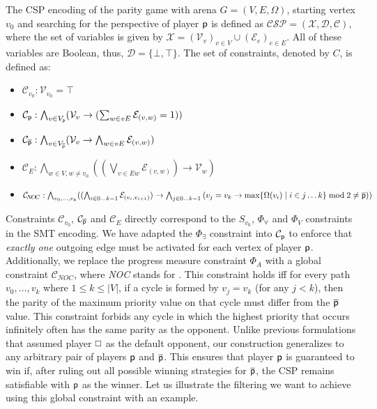 \documentclass[runningheads]{llncs}
\begin{document}
\begin{definition}\label{def:csp}
    The CSP encoding of the parity game with arena $G=(V,E,\Omega)$, starting vertex $v_0$ and searching for the perspective of player $\mathsf{p}$ is defined as $\mathcal{CSP = (X, D, C)}$, where the set of variables is given by $\mathcal{X} = (\mathcal{V}_v)_{v \in V} \cup (\mathcal{E}_e)_{e \in E}$. All of these variables are Boolean, thus, $\mathcal{D} = \{\bot,\top\}$. The set of constraints, denoted by $C$, is defined as:
    \begin{itemize}
        \item $\mathcal{C}_{v_0} : \mathcal{V}_{v_0} = \top$
        \item $\mathcal{C}_{\mathsf{p}} : \bigwedge_{v \in V_{\mathsf{p}}} (\mathcal{V}_v \rightarrow (\sum_{w \in vE} \mathcal{E}_{(v,w)}= 1))$
        \item $\mathcal{C}_{\overline{\mathsf{p}}} : \bigwedge_{v \in V_{\overline{\mathsf{p}}}} (\mathcal{V}_v \rightarrow \bigwedge_{w \in vE} \mathcal{E}_{(v,w)})$
        \item $\mathcal{C}_{\!E} : \bigwedge_{w \in V, w \neq v_0} ((\bigvee_{v \in Ew} \mathcal{E}_{(v,w)}) \rightarrow \mathcal{V}_w)$
        \item $\mathcal{C}_{\!N\!O\!C} : \bigwedge_{v_0, \dots, v_k} ((\bigwedge_{i\in 0\dots k-1} \mathcal{E}_{(v_i,v_{i+1})}) \rightarrow \bigwedge_{j\in 0\dots k-1}\\ (v_j=v_k \rightarrow \max\{\Omega(v_i) \mid i\in j\dots k\} \bmod 2 \ne \overline{\mathsf{p}}))$
    \end{itemize}
\end{definition}

Constraints $\mathcal{C}_{v_0}$, $\mathcal{C}_{\overline{\mathsf{p}}}$ and $\mathcal{C}_{\!E}$ directly correspond to the $S_{v_0}$, $\Phi_\forall$ and $\Phi_V$ constraints in the SMT encoding. We have adapted the $\Phi_\exists$ constraint into $\mathcal{C}_{\mathsf{p}}$ to enforce that \emph{exactly one} outgoing edge must be activated for each vertex of player $\mathsf{p}$. Additionally, we replace the progress measure constraint $\Phi_A$ with a global constraint $\mathcal{C}_{\!N\!O\!C}$, where \textit{NOC} stands for \noc. This constraint holds iff for every path $v_0,\ldots,v_k$ where $1\leq k\leq |V|$, if a cycle is formed by $v_j = v_k$ (for any $j < k$), then the parity of the maximum  priority value on that cycle must differ from the $\overline{\mathsf{p}}$ value. This constraint forbids any cycle in which the highest priority that occurs infinitely often has the same parity as the opponent. Unlike previous formulations that assumed player $\odd$ as the default opponent, our construction generalizes to any arbitrary pair of players $\mathsf{p}$ and $\overline{\mathsf{p}}$. This ensures that player $\mathsf{p}$ is guaranteed to win if, after ruling out all possible winning strategies for $\overline{\mathsf{p}}$, the CSP remains satisfiable with $\mathsf{p}$ as the winner.
%
Let us illustrate the filtering we want to achieve using this global constraint with an example.
\end{document}

